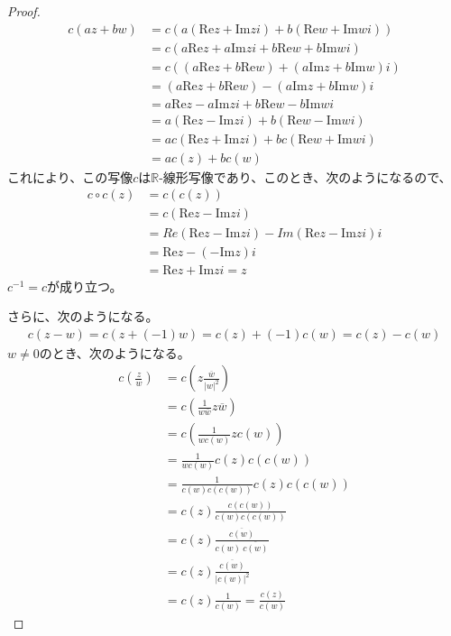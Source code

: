 \documentclass[dvipdfmx]{jsarticle}
\begin{document}
\begin{proof}
\begin{align*}
c(az + bw) &= c\left( a\left( \mathrm{Re}z + \mathrm{Im}zi \right) + b\left( \mathrm{Re}w + \mathrm{Im}wi \right) \right)\\
&= c\left( a\mathrm{Re}z + a\mathrm{Im}zi + b\mathrm{Re}w + b\mathrm{Im}wi \right)\\
&= c\left( \left( a\mathrm{Re}z + b\mathrm{Re}w \right) + \left( a\mathrm{Im}z + b\mathrm{Im}w \right)i \right)\\
&= \left( a\mathrm{Re}z + b\mathrm{Re}w \right) - \left( a\mathrm{Im}z + b\mathrm{Im}w \right)i\\
&= a\mathrm{Re}z - a\mathrm{Im}zi + b\mathrm{Re}w - b\mathrm{Im}wi\\
&= a\left( \mathrm{Re}z - \mathrm{Im}zi \right) + b\left( \mathrm{Re}w - \mathrm{Im}wi \right)\\
&= ac\left( \mathrm{Re}z + \mathrm{Im}zi \right) + bc\left( \mathrm{Re}w + \mathrm{Im}wi \right)\\
&= ac(z) + bc(w)
\end{align*}
これにより、この写像$c$は$\mathbb{R}$-線形写像であり、このとき、次のようになるので、
\begin{align*}
c \circ c(z) &= c\left( c(z) \right)\\
&= c\left( \mathrm{Re}z - \mathrm{Im}zi \right)\\
&= Re\left( \mathrm{Re}z - \mathrm{Im}zi \right) - Im\left( \mathrm{Re}z - \mathrm{Im}zi \right)i\\
&= \mathrm{Re}z - \left( - \mathrm{Im}z \right)i\\
&= \mathrm{Re}z + \mathrm{Im}zi = z
\end{align*}
$c^{- 1} = c$が成り立つ。\par
さらに、次のようになる。
\begin{align*}
c(z - w) = c\left( z + ( - 1)w \right) = c(z) + ( - 1)c(w) = c(z) - c(w)
\end{align*}
$w \neq 0$のとき、次のようになる。
\begin{align*}
c\left( \frac{z}{w} \right) &= c\left( z\frac{\overline{w}}{|w|^{2}} \right)\\
&= c\left( \frac{1}{w\overline{w}}z\overline{w} \right)\\
&= c\left( \frac{1}{wc(w)}zc(w) \right)\\
&= \frac{1}{wc(w)}c(z)c\left( c(w) \right)\\
&= \frac{1}{c(w)c\left( c(w) \right)}c(z)c\left( c(w) \right)\\
&= c(z)\frac{c\left( c(w) \right)}{c(w)c\left( c(w) \right)}\\
&= c(z)\frac{\overline{c(w)}}{c(w)\ \overline{c(w)}}\\
&= c(z)\frac{\overline{c(w)}}{\left| c(w) \right|^{2}}\\
&= c(z)\frac{1}{c(w)} = \frac{c(z)}{c(w)}
\end{align*}
\end{proof}
\end{document}
